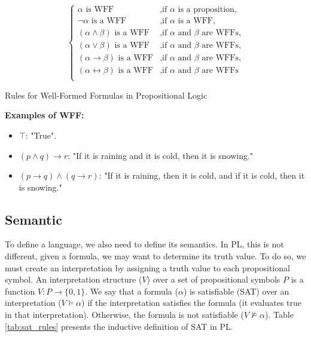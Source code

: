 \begin{table}[h] 
\[
\left\{
\begin{array}{ll}
\alpha \text{ is WFF} & \text{,if } \alpha \text{ is a proposition,}\\
\neg \alpha \text{ is a WFF} & \text{,if } \alpha \text{ is a WFF,}\\
(\alpha \land \beta) \text{ is a WFF} & \text{,if } \alpha \text{ and } \beta \text{ are WFFs,}\\
(\alpha \lor \beta) \text{ is a WFF} & \text{,if } \alpha \text{ and } \beta \text{ are WFFs,} \\
(\alpha \rightarrow \beta) \text{ is a WFF} & \text{,if } \alpha \text{ and } \beta \text{ are WFFs,} \\
(\alpha \leftrightarrow \beta) \text{ is a WFF} & \text{,if } \alpha \text{ and } \beta \text{ are WFFs} \\
\end{array}
\right.
\]

\caption{Rules for Well-Formed Formulas in Propositional Logic}
\label{tab:wff_rules}
\end{table}

\textbf{Examples of WFF:}
\begin{itemize}
    \item \(\top\): "True".
    \item \((p \land q) \to r\): "If it is raining and it is cold, then it is snowing."
    \item \((p \to q) \land (q \to r)\): "If it is raining, then it is cold, and if it is cold, then it is snowing."
\end{itemize}

\subsection{Semantic}
To define a language, we also need to define its semantics. In \gls{PL}, this is not different, given a formula, we may want to determine its truth value. To do so, we must create an interpretation by assigning a truth value to each propositional symbol. An interpretation structure (\( V \)) over a set of propositional symbols \( P \) is a function \( V : P \to \{0, 1\} \). We say that a formula (\(\alpha\)) is satisfiable (SAT) over an interpretation (\( V \models \alpha \)) if the interpretation satisfies the formula (it evaluates true in that interpretation). Otherwise, the formula is not satisfiable (\( V \not\models \alpha \)). Table \ref{tab:sat_rules} presents the inductive definition of SAT in \gls{PL}.

